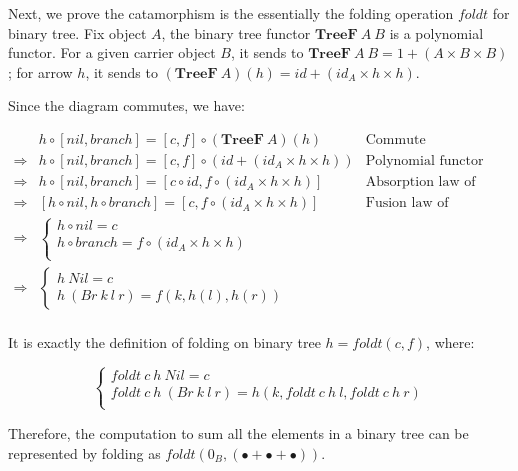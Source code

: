 \documentclass{article}
\begin{document}
\begin{example}
Next, we prove the catamorphism is the essentially the folding operation $foldt$ for binary tree. Fix object $A$, the binary tree functor $\mathbf{TreeF}\ A\ B$ is a polynomial functor. For a given carrier object $B$, it sends to $\mathbf{TreeF}\ A\ B = 1 + (A \times B \times B)$; for arrow $h$, it sends to $(\mathbf{TreeF}\ A)(h) = id + (id_A \times h \times h)$.

Since the diagram commutes, we have:

\[
\begin{array}{rll}
            & h \circ [nil, branch] = [c, f] \circ (\mathbf{TreeF}\ A)(h) & \text{Commute} \\
\Rightarrow & h \circ [nil, branch] = [c, f] \circ (id + (id_A \times h \times h)) & \text{Polynomial functor} \\
\Rightarrow & h \circ [nil, branch] = [c \circ id, f \circ (id_A \times h \times h)] & \text{Absorption law of coproduct on the right} \\
\Rightarrow & [h \circ nil, h \circ branch] = [c, f \circ (id_A \times h \times h)] & \text{Fusion law of coproduct on the left} \\
\Rightarrow &
  \begin{cases}
    h \circ nil = c \\
    h \circ branch = f \circ (id_A \times h \times h) \\
  \end{cases} & \\
\Rightarrow &
  \begin{cases}
    h\ Nil = c \\
    h\ (Br\ k\ l\ r) = f(k, h(l), h(r))
  \end{cases} & \\
\end{array}
\]

It is exactly the definition of folding on binary tree $h = foldt(c, f)$, where:

\[
\begin{cases}
foldt\ c\ h\ Nil = c \\
foldt\ c\ h\ (Br\ k\ l\ r) = h(k, foldt\ c\ h\ l, foldt\ c\ h\ r) \\
\end{cases}
\]

Therefore, the computation to sum all the elements in a binary tree can be represented by folding as $foldt(0_B, (\bullet + \bullet + \bullet))$.
\end{example}

\begin{Exercise}
\end{Exercise}
\end{document}
